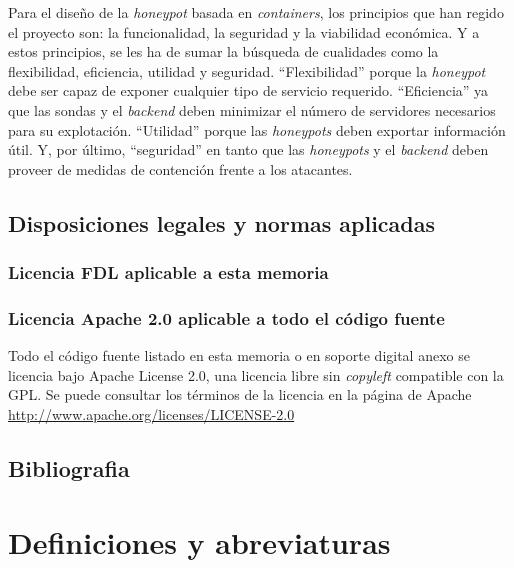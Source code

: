 Para el diseño de la \emph{honeypot} basada en \emph{containers}, los principios que han regido el proyecto son: la funcionalidad, la seguridad y la viabilidad económica. Y a estos principios, se les ha de sumar la búsqueda de cualidades como la flexibilidad, eficiencia, utilidad y seguridad. ``Flexibilidad'' porque la \emph{honeypot} debe ser capaz de exponer cualquier tipo de servicio requerido. ``Eficiencia'' ya que las sondas y el \emph{backend} deben minimizar el número de servidores necesarios para su explotación. ``Utilidad'' porque las \emph{honeypots} deben exportar información útil. Y, por último, ``seguridad''  en tanto que las \emph{honeypots} y el \emph{backend} deben proveer de medidas de contención frente a los atacantes.


\nocite{*}
\nopagebreak
\printbibheading[title={Normas y referencias},heading=subbibnumbered]
\subsection{Disposiciones legales y normas aplicadas}
\subsubsection{Licencia FDL aplicable a esta memoria}

\subsubsection{Licencia Apache 2.0 aplicable a todo el código fuente}
Todo el código fuente listado en esta memoria o en soporte digital anexo se licencia bajo Apache License 2.0, una licencia libre sin \emph{copyleft} compatible con la GPL.
Se puede consultar los términos de la licencia en la página de Apache \url{http://www.apache.org/licenses/LICENSE-2.0}

\subsection{Bibliografia}
\printbibliography[title={Referencias},heading=none]
\nopagebreak
\section{Definiciones y abreviaturas}

